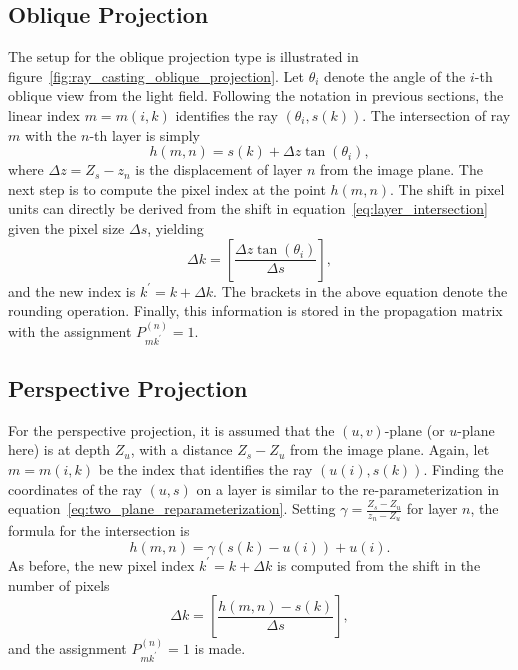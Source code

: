 \subsection*{Oblique Projection}

The setup for the oblique projection type is illustrated in figure~\ref{fig:ray_casting_oblique_projection}.
Let $\theta_i$ denote the angle of the \mbox{$i$-th} oblique view from the light field.
Following the notation in previous sections, the linear index $m = m(i, k)$ identifies the ray $(\theta_i, s(k))$.
The intersection of ray $m$ with the \mbox{$n$-th} layer is simply
\begin{equation}\label{eq:layer_intersection}
	h(m, n) = s(k) + \Delta z \tan (\theta_i), 
\end{equation}
where $\Delta z = Z_s - z_n$ is the displacement of layer $n$ from the image plane.
The next step is to compute the pixel index at the point $h(m, n)$.
The shift in pixel units can directly be derived from the shift in equation~\ref{eq:layer_intersection} given the pixel size $\Delta s$, yielding
\begin{equation}
	\Delta k = \left[ \frac{\Delta z \tan (\theta_i)}{\Delta s} \right],
\end{equation}
and the new index is $k^\prime = k + \Delta k$.
The brackets in the above equation denote the rounding operation.
Finally, this information is stored in the propagation matrix with the assignment $P_{m k^\prime}^{(n)} = 1$.

\subsection*{Perspective Projection}

For the perspective projection, it is assumed that the \mbox{$(u, v)$-plane} (or \mbox{$u$-plane} here) is at depth $Z_u$, with a distance $Z_s - Z_u$ from the image plane.
Again, let $m = m(i, k)$ be the index that identifies the ray $(u(i), s(k))$.
Finding the coordinates of the ray $(u, s)$ on a layer is similar to the re-parameterization in equation~\ref{eq:two_plane_reparameterization}.
Setting $\gamma = \frac{Z_s - Z_u}{z_n - Z_u}$ for layer $n$, the formula for the intersection is
\begin{equation}
	h(m, n) = \gamma (s(k) - u(i)) + u(i).
\end{equation}
As before, the new pixel index $k^\prime = k + \Delta k$ is computed from the shift in the number of pixels
\begin{equation}\label{eq:pixel_shift_perspective_projection}
	\Delta k = \left[ \frac{h(m, n) - s(k)}{\Delta s} \right], 
\end{equation}
and the assignment $P_{m k^\prime}^{(n)} = 1$ is made.

